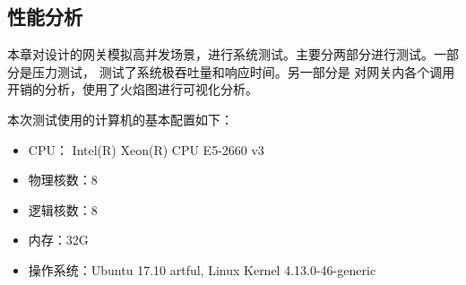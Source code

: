 \documentclass[twoside]{CUGThesis}
\begin{document}
	\begin{spacing}{2}
		\section{性能分析}
	\end{spacing}

	本章对设计的网关模拟高并发场景，进行系统测试。主要分两部分进行测试。一部分是压力测试，
	测试了系统极吞吐量和响应时间。另一部分是
	对网关内各个调用开销的分析，使用了火焰图进行可视化分析。\par 
	本次测试使用的计算机的基本配置如下：\par 
	\begin{itemize}
		\item CPU： Intel(R) Xeon(R) CPU E5-2660 v3
		\item 物理核数：8
		\item 逻辑核数：8
		\item 内存：32G
		\item 操作系统：Ubuntu 17.10 artful, Linux Kernel 4.13.0-46-generic
	\end{itemize}
\end{document}
